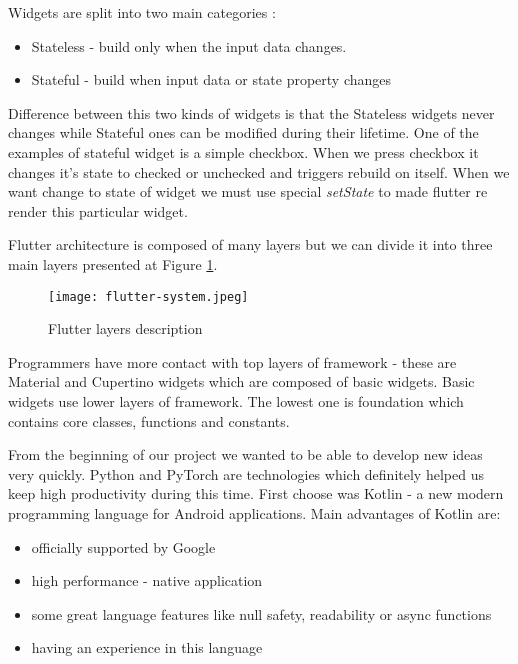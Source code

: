 \documentclass[../Main.tex]{subfiles}
\begin{document}
        
        Widgets are split into two main categories \cite{flutter-docs2}:
        \begin{itemize}
             \item Stateless - build only when the input data changes. 
             \item Stateful - build when input data or state property changes 
        \end{itemize}
        Difference between this two kinds of widgets is that the Stateless widgets
        never changes while Stateful ones can be modified during their lifetime.
        One of the examples of stateful widget is a simple checkbox. When we press checkbox
        it changes it's state to checked or unchecked and triggers rebuild on itself.
        When we want change to state of widget we must use special 
        \textit{setState} to made flutter re render this particular widget.
    
        
        Flutter architecture is composed of many layers \cite{flutter-docs} but we can divide it into 
        three main layers presented at Figure \ref{fig:flutter-layers}.
        \begin{figure}[h]
            \centering
            \texttt{[image: flutter-system.jpeg]}
            \caption{Flutter layers description \cite{flutter-docs}}
            \label{fig:flutter-layers}
        \end{figure}
        Programmers have more contact with top layers of framework - 
        these are Material and Cupertino widgets which are composed of basic widgets.
        Basic widgets use lower layers of framework. 
        The lowest one is foundation which contains core classes, functions and constants.
    
    
        From the beginning of our project we wanted to be able to develop new ideas
        very quickly.
        Python and PyTorch are technologies which definitely helped us keep high
        productivity during this time. First choose was Kotlin - a new modern programming 
        language for Android applications. Main advantages of Kotlin are:
            \begin{itemize}
                \item officially supported by Google
                \item high performance - native application
                \item some great language features like null safety, readability or async functions
                \item having an experience in this language
            \end{itemize}
            
\end{document}
